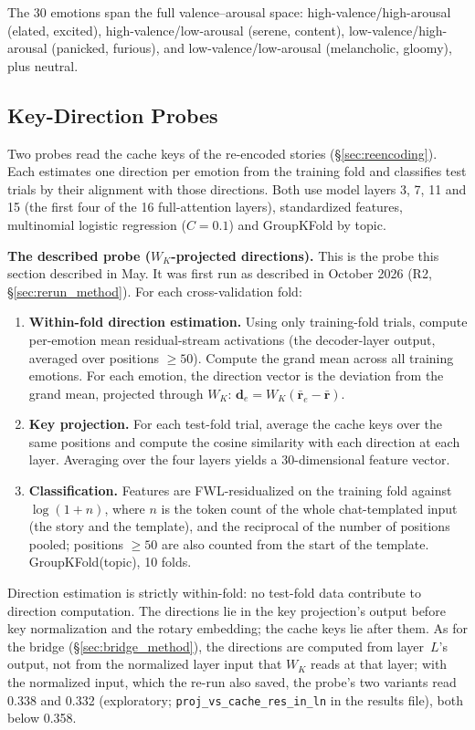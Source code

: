\documentclass[11pt,a4paper]{article}
\begin{document}
The 30 emotions span the full valence--arousal space: high-valence/high-arousal (elated, excited), high-valence/low-arousal (serene, content), low-valence/high-arousal (panicked, furious), and low-valence/low-arousal (melancholic, gloomy), plus neutral.

\subsection{Key-Direction Probes}
\label{sec:wk_probe_method}

Two probes read the cache keys of the re-encoded stories (\S\ref{sec:reencoding}). Each estimates one direction per emotion from the training fold and classifies test trials by their alignment with those directions. Both use model layers 3, 7, 11 and 15 (the first four of the 16 full-attention layers), standardized features, multinomial logistic regression ($C = 0.1$) and GroupKFold by topic.

\textbf{The described probe ($W_K$-projected directions).} This is the probe this section described in May. It was first run as described in October 2026 (R2, \S\ref{sec:rerun_method}). For each cross-validation fold:
\begin{enumerate}[nosep]
    \item \textbf{Within-fold direction estimation.} Using only training-fold trials, compute per-emotion mean residual-stream activations (the decoder-layer output, averaged over positions $\geq 50$). Compute the grand mean across all training emotions. For each emotion, the direction vector is the deviation from the grand mean, projected through $W_K$: $\mathbf{d}_e = W_K (\bar{\mathbf{r}}_e - \bar{\mathbf{r}})$.
    \item \textbf{Key projection.} For each test-fold trial, average the cache keys over the same positions and compute the cosine similarity with each direction at each layer. Averaging over the four layers yields a 30-dimensional feature vector.
    \item \textbf{Classification.} Features are FWL-residualized on the training fold against $\log(1 + n)$, where $n$ is the token count of the whole chat-templated input (the story and the template), and the reciprocal of the number of positions pooled; positions $\geq 50$ are also counted from the start of the template. GroupKFold(topic), 10 folds.
\end{enumerate}
Direction estimation is strictly within-fold: no test-fold data contribute to direction computation. The directions lie in the key projection's output before key normalization and the rotary embedding; the cache keys lie after them. As for the bridge (\S\ref{sec:bridge_method}), the directions are computed from layer~$L$'s output, not from the normalized layer input that $W_K$ reads at that layer; with the normalized input, which the re-run also saved, the probe's two variants read 0.338 and 0.332 (exploratory; \texttt{proj\_vs\_cache\_res\_in\_ln} in the results file), both below 0.358.
\end{document}
